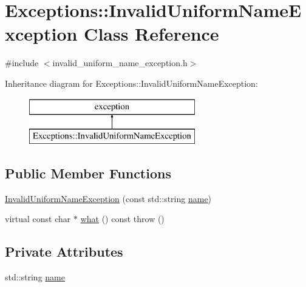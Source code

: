 \hypertarget{class_exceptions_1_1_invalid_uniform_name_exception}{}\section{Exceptions\+:\+:Invalid\+Uniform\+Name\+Exception Class Reference}
\label{class_exceptions_1_1_invalid_uniform_name_exception}


{\ttfamily \#include $<$invalid\+\_\+uniform\+\_\+name\+\_\+exception.\+h$>$}

Inheritance diagram for Exceptions\+:\+:Invalid\+Uniform\+Name\+Exception\+:\begin{figure}[H]
\begin{center}
\leavevmode
\includegraphics[height=2.000000cm]{class_exceptions_1_1_invalid_uniform_name_exception}
\end{center}
\end{figure}
\subsection*{Public Member Functions}
\begin{DoxyCompactItemize}
\item 
\hyperlink{class_exceptions_1_1_invalid_uniform_name_exception_a1eb355e5fbb46a511d5b94a6918eca31}{Invalid\+Uniform\+Name\+Exception} (const std\+::string \hyperlink{class_exceptions_1_1_invalid_uniform_name_exception_a6cb6b066c8b98fff6eb2c90da9aa1fb0}{name})
\item 
virtual const char $\ast$ \hyperlink{class_exceptions_1_1_invalid_uniform_name_exception_aca344333a94b1a1100d54d38392a109f}{what} () const   throw ()
\end{DoxyCompactItemize}
\subsection*{Private Attributes}
\begin{DoxyCompactItemize}
\item 
std\+::string \hyperlink{class_exceptions_1_1_invalid_uniform_name_exception_a6cb6b066c8b98fff6eb2c90da9aa1fb0}{name}
\end{DoxyCompactItemize}


